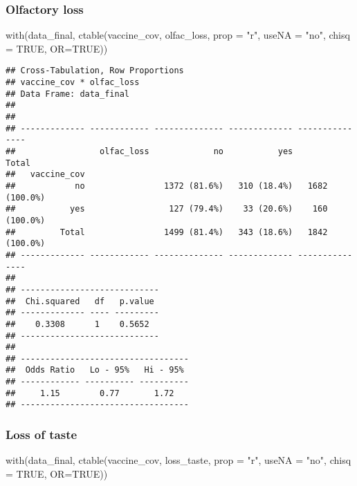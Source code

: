 \documentclass[
]{article}
\newenvironment{Shaded}{\begin{snugshade}}{\end{snugshade}}
\newcommand{\AttributeTok}[1]{\textcolor[rgb]{0.77,0.63,0.00}{#1}}
\newcommand{\ConstantTok}[1]{\textcolor[rgb]{0.00,0.00,0.00}{#1}}
\newcommand{\FunctionTok}[1]{\textcolor[rgb]{0.00,0.00,0.00}{#1}}
\newcommand{\NormalTok}[1]{#1}
\newcommand{\StringTok}[1]{\textcolor[rgb]{0.31,0.60,0.02}{#1}}
\begin{document}
\hypertarget{olfactory-loss}{%
\subsubsection{Olfactory loss}\label{olfactory-loss}}

\begin{Shaded}
\begin{Highlighting}[]
\FunctionTok{with}\NormalTok{(data\_final, }\FunctionTok{ctable}\NormalTok{(vaccine\_cov, olfac\_loss, }\AttributeTok{prop =} \StringTok{"r"}\NormalTok{, }\AttributeTok{useNA =} \StringTok{"no"}\NormalTok{, }\AttributeTok{chisq =} \ConstantTok{TRUE}\NormalTok{, }\AttributeTok{OR=}\ConstantTok{TRUE}\NormalTok{))}
\end{Highlighting}
\end{Shaded}

\begin{verbatim}
## Cross-Tabulation, Row Proportions  
## vaccine_cov * olfac_loss  
## Data Frame: data_final  
## 
## 
## ------------- ------------ -------------- ------------- ---------------
##                 olfac_loss             no           yes           Total
##   vaccine_cov                                                          
##            no                1372 (81.6%)   310 (18.4%)   1682 (100.0%)
##           yes                 127 (79.4%)    33 (20.6%)    160 (100.0%)
##         Total                1499 (81.4%)   343 (18.6%)   1842 (100.0%)
## ------------- ------------ -------------- ------------- ---------------
## 
## ----------------------------
##  Chi.squared   df   p.value 
## ------------- ---- ---------
##    0.3308      1    0.5652  
## ----------------------------
## 
## ----------------------------------
##  Odds Ratio   Lo - 95%   Hi - 95% 
## ------------ ---------- ----------
##     1.15        0.77       1.72   
## ----------------------------------
\end{verbatim}

\hypertarget{loss-of-taste}{%
\subsubsection{Loss of taste}\label{loss-of-taste}}

\begin{Shaded}
\begin{Highlighting}[]
\FunctionTok{with}\NormalTok{(data\_final, }\FunctionTok{ctable}\NormalTok{(vaccine\_cov, loss\_taste, }\AttributeTok{prop =} \StringTok{"r"}\NormalTok{, }\AttributeTok{useNA =} \StringTok{"no"}\NormalTok{, }\AttributeTok{chisq =} \ConstantTok{TRUE}\NormalTok{, }\AttributeTok{OR=}\ConstantTok{TRUE}\NormalTok{))}
\end{Highlighting}
\end{Shaded}
\end{document}
